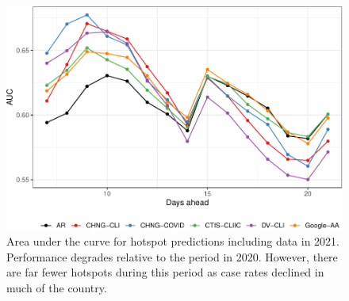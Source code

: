 \documentclass[9pt,twoside,lineno]{pnas-new}
\begin{document}
\clearpage

\begin{figure}

{\centering \includegraphics[width=\textwidth]{fig/hot-alldates-1} 

}

\caption{Area under the curve for hotspot predictions including data in 2021. Performance degrades relative to the period in 2020. However, there are far fewer hotspots during this period as case rates declined in much of the country.}\label{fig:hot-alldates}
\end{figure}

\clearpage

\clearpage

\FloatBarrier










\end{document}
